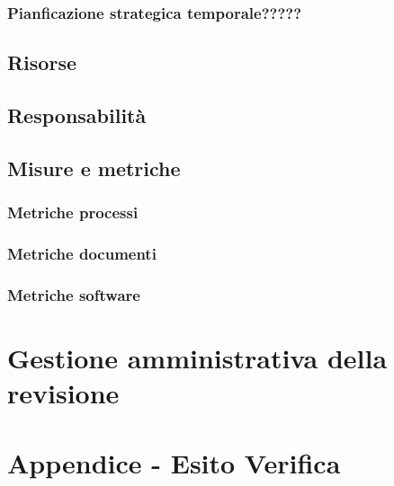 \documentclass[a4paper, oneside, openany, dvipsnames, table]{article}
\begin{document}
		\subsubsection{Pianficazione strategica temporale?????}
	\subsection{Risorse}
	\subsection{Responsabilità}
	\subsection{Misure e metriche}
		\subsubsection{Metriche processi}
		\subsubsection{Metriche documenti}
		\subsubsection{Metriche software}
\section{Gestione amministrativa della revisione}

\section{Appendice - Esito Verifica}
\end{document}
